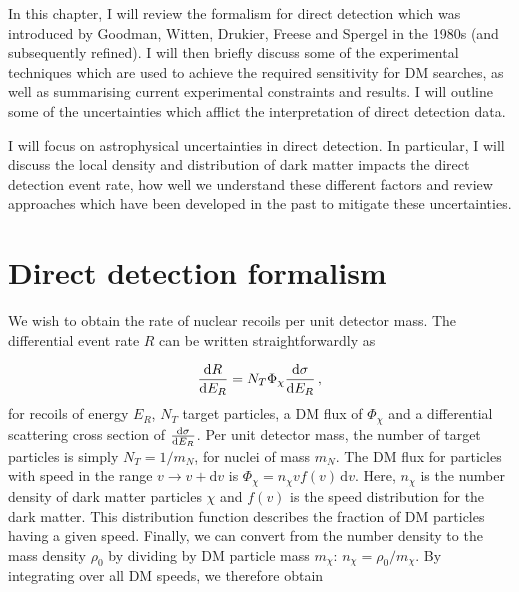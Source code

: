 In this chapter, I will review the formalism for direct detection which was introduced by Goodman, Witten, Drukier, Freese and Spergel in the 1980s (and subsequently refined). I will then briefly discuss some of the experimental techniques which are used to achieve the required sensitivity for DM searches, as well as summarising current experimental constraints and results. I will outline some of the uncertainties which afflict the interpretation of direct detection data.

I will focus on astrophysical uncertainties in direct detection. In particular, I will discuss the local density and distribution of dark matter impacts the direct detection event rate, how well we understand these different factors and review approaches which have been developed in the past to mitigate these uncertainties.

\section{Direct detection formalism}





We wish to obtain the rate of nuclear recoils per unit detector mass. The differential event rate $R$ can be written straightforwardly as

\begin{equation}
\frac{\mathrm{d}R}{\mathrm{d}E_R} = N_T \Phi_\chi \frac{\mathrm{d}\sigma}{\mathrm{d}E_R}\,,
\end{equation}
for recoils of energy $E_R$, $N_T$ target particles, a DM flux of $\Phi_\chi$ and a differential scattering cross section of $\frac{\mathrm{d}\sigma}{\mathrm{d}E_R}$. Per unit detector mass, the number of target particles is simply $N_T = 1/m_N$, for nuclei of mass $m_N$. The DM flux for particles with speed in the range $v \rightarrow v + \mathrm{d}v$ is $\Phi_\chi = n_\chi v f(v) \,\mathrm{d}v$. Here, $n_\chi$ is the number density of dark matter particles $\chi$ and $f(v)$ is the speed distribution for the dark matter. This distribution function describes the fraction of DM particles having a given speed. Finally, we can convert from the number density to the mass density $\rho_0$ by dividing by DM particle mass $m_\chi$: $n_\chi = \rho_0/m_\chi$. By integrating over all DM speeds, we therefore obtain

